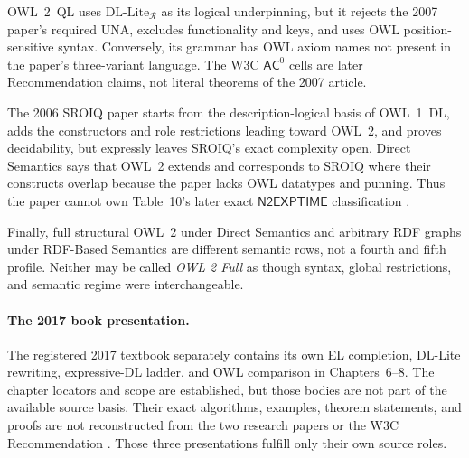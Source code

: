 OWL~2~QL uses \(\mathrm{DL\mbox{-}Lite}_{\mathcal R}\) as its logical
underpinning, but it rejects the 2007 paper's required UNA, excludes
functionality and keys, and uses OWL position-sensitive syntax.  Conversely,
its grammar has OWL axiom names not present in the paper's three-variant
language.  The W3C \(\mathsf{AC}^{0}\) cells are later Recommendation claims,
not literal theorems of the 2007 article.

The 2006 SROIQ paper starts from the description-logical basis of OWL~1~DL,
adds the constructors and role restrictions leading toward OWL~2, and proves
decidability, but expressly leaves SROIQ's exact complexity open.  Direct
Semantics says that OWL~2 extends and corresponds to SROIQ where their
constructs overlap because the paper lacks OWL datatypes and punning.  Thus the
paper cannot own Table~10's later exact \(\mathsf{N2EXPTIME}\) classification
\cite{HorrocksKutzSattler2006,W3COWL2DirectSemantics2012}.

Finally, full structural OWL~2 under Direct Semantics and arbitrary RDF graphs
under RDF-Based Semantics are different semantic rows, not a fourth and fifth
profile.  Neither may be called \emph{OWL 2 Full} as though syntax, global
restrictions, and semantic regime were interchangeable.

\paragraph{The 2017 book presentation.}
The registered 2017 textbook separately contains its own EL completion,
DL-Lite rewriting, expressive-DL ladder, and OWL comparison in Chapters~6--8.
The chapter locators and scope are established, but those bodies are not part
of the available source basis.  Their exact algorithms, examples, theorem
statements, and proofs are not reconstructed from the two research papers or
the W3C Recommendation \cite{BaaderHorrocksLutzSattler2017}.  Those three
presentations fulfill only their own source roles.
